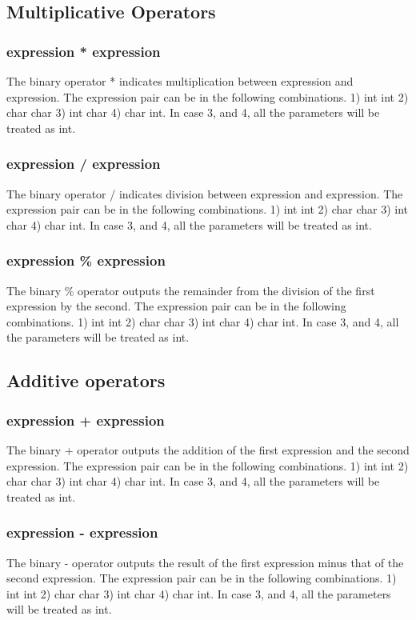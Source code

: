 \documentclass[a4paper,12pt]{article}
\begin{document}
\subsection{Multiplicative Operators}
\subsubsection{expression * expression}
The binary operator * indicates multiplication between expression and expression. The expression pair can be in the following combinations. 1) int int 2) char char 3) int char 4) char int. In case 3, and 4, all the parameters will be treated as int.
\subsubsection{expression / expression}
The binary operator / indicates division between expression and expression. The expression pair can be in the following combinations. 1) int int 2) char char 3) int char 4) char int. In case 3, and 4, all the parameters will be treated as int.
\subsubsection{expression \% expression}
The binary \% operator outputs the remainder from the division of the first expression by the second. The expression pair can be in the following combinations. 1) int int 2) char char 3) int char 4) char int. In case 3, and 4, all the parameters will be treated as int.
\subsection{Additive operators}
\subsubsection{expression + expression}
The binary + operator outputs the addition of the first expression and the second expression. The expression pair can be in the following combinations. 1) int int 2) char char 3) int char 4) char int. In case 3, and 4, all the parameters will be treated as int.
\subsubsection{expression - expression}
The binary - operator outputs the result of the first expression minus that of the second expression. The expression pair can be in the following combinations. 1) int int 2) char char 3) int char 4) char int. In case 3, and 4, all the parameters will be treated as int.
\end{document}
